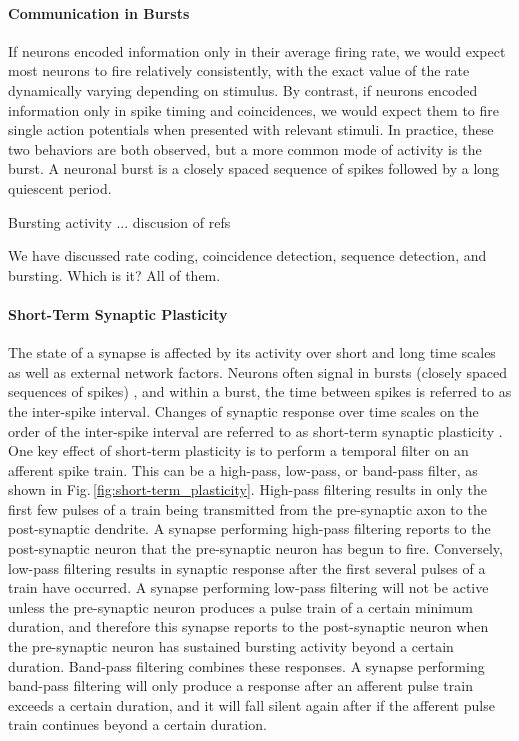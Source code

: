 \documentclass[twocolumn]{article}
\begin{document}
\paragraph{Communication in Bursts}
If neurons encoded information only in their average firing rate, we would expect most neurons to fire relatively consistently, with the exact value of the rate dynamically varying depending on stimulus. By contrast, if neurons encoded information only in spike timing and coincidences, we would expect them to fire single action potentials when presented with relevant stimuli. In practice, these two behaviors are both observed, but a more common mode of activity is the burst. A neuronal burst is a closely spaced sequence of spikes followed by a long quiescent period. 

Bursting activity ... discusion of refs \cite{li1997,izde2003}

\vspace{3em}
We have discussed rate coding, coincidence detection, sequence detection, and bursting. Which is it? All of them. \cite{majo2005}

\paragraph{Short-Term Synaptic Plasticity}
The state of a synapse is affected by its activity over short and long time scales as well as external network factors. Neurons often signal in bursts (closely spaced sequences of spikes) \cite{iz2007}, and within a burst, the time between spikes is referred to as the inter-spike interval. Changes of synaptic response over time scales on the order of the inter-spike interval are referred to as short-term synaptic plasticity \cite{abre2004}. One key effect of short-term plasticity is to perform a temporal filter on an afferent spike train. This can be a high-pass, low-pass, or band-pass filter, as shown in Fig.\,\ref{fig:short-term_plasticity}. High-pass filtering results in only the first few pulses of a train being transmitted from the pre-synaptic axon to the post-synaptic dendrite. A synapse performing high-pass filtering reports to the post-synaptic neuron that the pre-synaptic neuron has begun to fire. Conversely, low-pass filtering results in synaptic response after the first several pulses of a train have occurred. A synapse performing low-pass filtering will not be active unless the pre-synaptic neuron produces a pulse train of a certain minimum duration, and therefore this synapse reports to the post-synaptic neuron when the pre-synaptic neuron has sustained bursting activity beyond a certain duration. Band-pass filtering combines these responses. A synapse performing band-pass filtering will only produce a response after an afferent pulse train exceeds a certain duration, and it will fall silent again after if the afferent pulse train continues beyond a certain duration.
\end{document}
